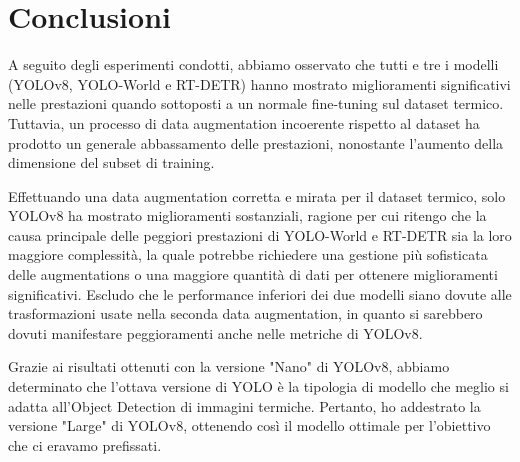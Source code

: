 \chapter*{Conclusioni}

A seguito degli esperimenti condotti, abbiamo osservato che tutti e tre i modelli (YOLOv8, YOLO-World e RT-DETR) hanno mostrato miglioramenti significativi nelle prestazioni quando sottoposti a un normale fine-tuning sul dataset termico. Tuttavia, un processo di data augmentation incoerente rispetto al dataset ha prodotto un generale abbassamento delle prestazioni, nonostante l'aumento della dimensione del subset di training.

Effettuando una data augmentation corretta e mirata per il dataset termico, solo YOLOv8 ha mostrato miglioramenti sostanziali, ragione per cui ritengo che la causa principale delle peggiori prestazioni di YOLO-World e RT-DETR sia la loro maggiore complessità, la quale potrebbe richiedere una gestione più sofisticata delle augmentations o una maggiore quantità di dati per ottenere miglioramenti significativi. Escludo che le performance inferiori dei due modelli siano dovute alle trasformazioni usate nella seconda data augmentation, in quanto si sarebbero dovuti manifestare peggioramenti anche nelle metriche di YOLOv8. 

Grazie ai risultati ottenuti con la versione "Nano" di YOLOv8, abbiamo determinato che l'ottava versione di YOLO è la tipologia di modello che meglio si adatta all'Object Detection di immagini termiche. Pertanto, ho addestrato la versione "Large" di YOLOv8, ottenendo così il modello ottimale per l'obiettivo che ci eravamo prefissati.